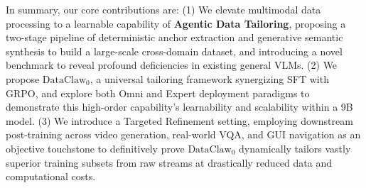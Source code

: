 In summary, our core contributions are: 
(1) We elevate multimodal data processing to a learnable capability of \textbf{Agentic Data Tailoring}, proposing a two-stage pipeline of deterministic anchor extraction and generative semantic synthesis to build a large-scale cross-domain dataset, and introducing a novel benchmark to reveal profound deficiencies in existing general VLMs. 
(2) We propose $\text{$\text{DataClaw}_0$}$, a universal tailoring framework synergizing SFT with GRPO, and explore both Omni and Expert deployment paradigms to demonstrate this high-order capability's learnability and scalability within a 9B model. 
(3) We introduce a Targeted Refinement setting, employing downstream post-training across video generation, real-world VQA, and GUI navigation as an objective touchstone to definitively prove $\text{DataClaw}_0$ dynamically tailors vastly superior training subsets from raw streams at drastically reduced data and computational costs.